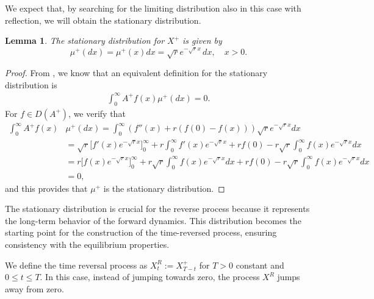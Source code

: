 \documentclass[11pt,a4paper]{article}
\newtheorem{lemma}[theorem]{Lemma}
\theoremstyle{definition}
\theoremstyle{remark}
\begin{document}
We expect that, by searching for the limiting distribution also in this case with reflection, we will obtain the stationary distribution.
\begin{lemma}
	The stationary distribution for \(X^+\) is given by
	\[
	\mu^+(dx) = \mu^+(x) dx={\sqrt{r}} e^{-\sqrt{r} x} \, dx, \quad x >0.
	\]
\end{lemma}
\begin{proof}
	From \cite[Proposition 9.2]{markov-book}, we know that an equivalent definition for the stationary distribution is
	\begin{align*}
		\int_0^\infty A^+ f(x) \mu^+(dx)=0.
	\end{align*}
	For \( f \in {D}(A^+)\), we verify that
	\begin{align*}
		\int_0^\infty A^+ f(x) &\mu^+(dx)= \int_0^\infty (f''(x) + r(f(0) - f(x) ) ) \sqrt{r} e^{-\sqrt{r} x}dx\\
		&=\sqrt{r} \big[f'(x) e^{-\sqrt{r} x}\big]^\infty_0 + r \int_0^\infty f'(x) e^{-\sqrt{r} x} + rf(0) - r \sqrt{r} \int_0^\infty f(x) e^{-\sqrt{r} x} dx\\
		&= r\big[f(x) e^{-\sqrt{r} x}\big]^\infty_0 + r \sqrt{r} \int_0^\infty f(x)e^{-\sqrt{r} x} dx + rf(0) - r \sqrt{r} \int_0^\infty f(x) e^{-\sqrt{r} x} dx\\
		&=0,
	\end{align*}
	and this provides that $\mu^+$ is the stationary distribution.
\end{proof}
The stationary distribution is crucial for the reverse process because it represents the long-term behavior of the forward dynamics. This distribution becomes the starting point for the construction of the time-reversed process, ensuring consistency with the equilibrium properties. %

We define the time reversal process %
as \(X^R_t := X^+_{T-t}\) for \(T>0\) constant and \(0 \leq t \leq T\).  In this case, instead of jumping towards zero, the process \(X^R\) jumps away from zero.
\end{document}
